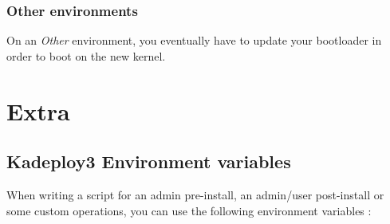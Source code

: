 \documentclass[a4wide,10pt,oneside]{book}
\begin{document}
\subsubsection{Other environments}
On an \emph{Other} environment, you eventually have to update your bootloader in order to boot on the new kernel.


\section{Extra}
\subsection{Kadeploy3 Environment variables}\label{sec:env_vars}
When writing a script for an admin pre-install, an admin/user post-install or some custom operations, you can use the following environment variables :
\end{document}
